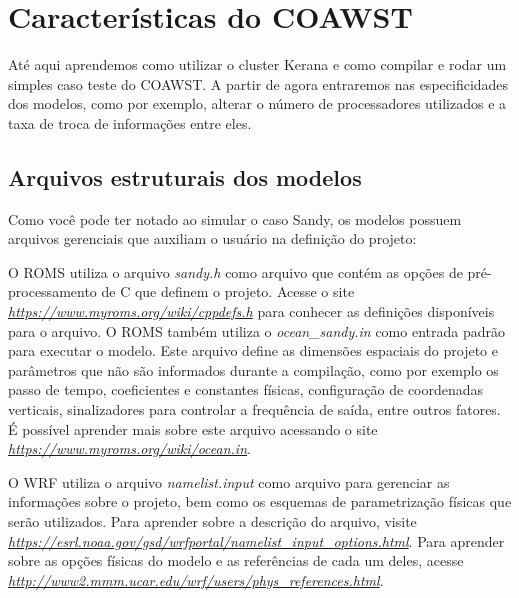 \chapter{Características do COAWST}

\noindent Até aqui aprendemos como utilizar o cluster Kerana e como compilar e rodar um simples caso teste do COAWST. 
          A partir de agora entraremos nas especificidades dos modelos, como por exemplo, alterar o número de processadores utilizados
          e a taxa de troca de informações entre eles.
\bigskip

\section{Arquivos estruturais dos modelos}
\bigskip

\noindent Como você pode ter notado ao simular o caso Sandy, os modelos possuem arquivos gerenciais que auxiliam o usuário na definição 
          do projeto:
\bigskip

\noindent O ROMS utiliza o arquivo \textit{sandy.h} como arquivo que contém as opções de pré-processamento de C que definem o projeto.
          Acesse o site \textcolor{bleu_cite}{\href{https://www.myroms.org/wiki/cppdefs.h}{\textit{https://www.myroms.org/wiki/cppdefs.h}}} 
          para conhecer as definições disponíveis para o arquivo. O ROMS também utiliza o \textit{ocean\_sandy.in} como entrada padrão para 
          executar o modelo. Este arquivo define as dimensões espaciais do projeto e parâmetros que não são informados durante a compilação, 
          como por exemplo os passo de tempo, coeficientes e constantes físicas, configuração de coordenadas verticais, sinalizadores para 
          controlar a frequência de saída, entre outros fatores. É possível aprender mais sobre este arquivo acessando o 
          site \textcolor{bleu_cite}{\href{https://www.myroms.org/wiki/ocean.in}{\textit{https://www.myroms.org/wiki/ocean.in}}}.
\bigskip

\noindent O WRF utiliza o arquivo \textit{namelist.input} como arquivo para gerenciar as informações sobre o projeto, bem como os 
          esquemas de parametrização físicas que serão utilizados. Para aprender sobre a descrição do arquivo, 
          visite \textcolor{bleu_cite}{\href{https://esrl.noaa.gov/gsd/wrfportal/namelist\_input\_options.html}{\textit{https://esrl.noaa.gov/gsd/wrfportal/namelist\_input\_options.html}}}.
          Para aprender sobre as opções físicas do modelo e as referências de cada um deles, acesse 
          \textcolor{bleu_cite}{\href{http://www2.mmm.ucar.edu/wrf/users/phys\_references.html}{\textit{http://www2.mmm.ucar.edu/wrf/users/phys\_references.html}}}.
\bigskip

